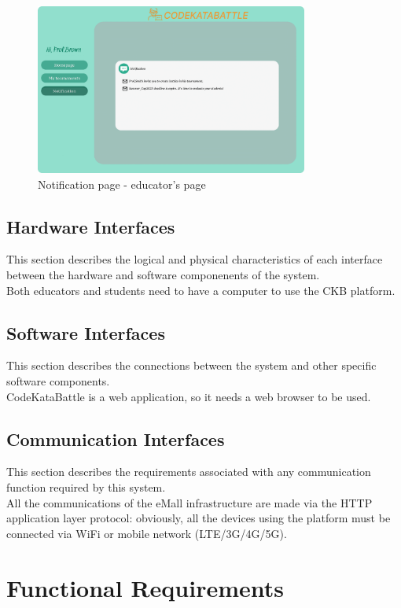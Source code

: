 \begin{figure}[H]
    \centering
    \includegraphics[width=0.8\textwidth]{images/user_interface/UI_sw2-15.png}
    \caption{Notification page - educator's page}
\end{figure}


\subsection{Hardware Interfaces}
This section describes the logical and physical characteristics of each interface 
between the hardware and software componenents of the system.\\
Both educators and students need to have a computer to use the CKB platform.\\
\subsection{Software Interfaces}
This section describes the connections between the system and other specific software components.\\
CodeKataBattle is a web application, so it needs a web browser to be used.\\
\subsection{Communication Interfaces}
This section describes the requirements associated with any communication function required
by this system.\\
All the communications of the eMall infrastructure are made via the HTTP application layer
protocol: obviously, all the devices using the platform must be connected via WiFi or mobile
network (LTE/3G/4G/5G).\\

\section{Functional Requirements}
